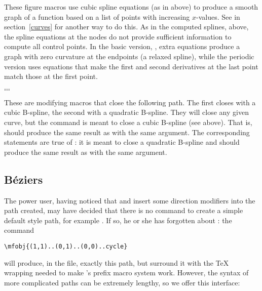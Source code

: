 \documentclass[letterpaper]{article}
\begin{document}
These figure macros use cubic spline equations (as in
 above) to produce a smooth graph of a function based
on a list of points with increasing $x$-values. See  in
section~\ref{curves} for another way to do this. As in the computed
splines, above, the spline equations at the nodes do not provide
sufficient information to compute all control points. In the basic
version, , extra equations produce a graph with zero
curvature at the endpoints (a relaxed spline), while the periodic
version uses equations that make the first and second derivatives at the
last point match those at the first point.

\begin{cd}
$\ldots$\\
$\ldots$%
%
\end{cd}

These are modifying macros that close the following path. The first
closes with a cubic B-spline, the second with a quadratic B-spline. They
will close any given curve, but the command  is meant to
close a cubic B-spline (see above). That is, 
should produce the same result as  with the same
argument. The corresponding statements are true of : it is
meant to close a quadratic B-spline and  should
produce the same result as  with the same argument.


\subsection{B\'eziers}

The power user, having noticed that  and  insert
some direction modifiers into the path created, may have decided that
there is no \mfp{} command to create a simple \MF{} default style path,
for example . If so, he or she has forgotten
about : the command
\begin{verbatim}
\mfobj{(1,1)..(0,1)..(0,0)..cycle}
\end{verbatim}
will produce, in the  file, exactly this path, but surround it
with the \TeX{} wrapping needed to make \mfp{}'s prefix macro system work.
However, the syntax of more complicated paths can be extremely lengthy,
so we offer this interface:

\begin{cd}
  \\
%
\end{cd}
\end{document}
